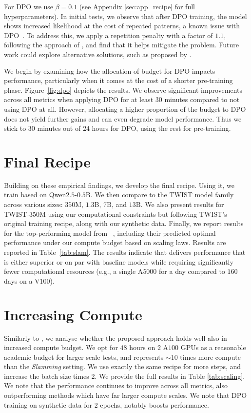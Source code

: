 For DPO we use $\beta=0.1$ (see Appendix \ref{sec:app_recipe} for full hyperparameters). In initial tests, we observe that after DPO training, the model shows increased likelihood at the cost of repeated patterns, a known issue with DPO~\citep{divpo}. To address this, we apply a repetition penalty with a factor of $1.1$, following the approach of \citet{ctrl}, and find that it helps mitigate the problem. Future work could explore alternative solutions, such as proposed by \citet{divpo}. 

We begin by examining how the allocation of budget for DPO impacts performance, particularly when it comes at the cost of a shorter pre-training phase. Figure~\ref{fig:dpo} depicts the results. We observe significant improvements across all metrics when applying DPO for at least $30$ minutes compared to not using DPO at all. However, allocating a higher proportion of the budget to DPO does not yield further gains and can even degrade model performance. Thus we stick to $30$ minutes out of $24$  hours for DPO, using the rest for pre-training. 


\section{Final Recipe} 
\label{sec:recipe}
Building on these empirical findings, we develop the final \method recipe. Using it, we train \slms based on Qwen$2.5$-$0.5$B. We then compare \method to the TWIST model family across various sizes: $350$M, $1.3$B, $7$B, and $13$B. We also present results for TWIST-$350$M using our computational constraints but following TWIST's original training recipe, along with our synthetic data. Finally, we report results for the top-performing model from ~\cite{cuervo2024scaling}, including their predicted optimal performance under our compute budget based on \slm scaling laws. Results are reported in Table~\ref{tab:slam}. The results indicate that \method delivers performance that is either superior or on par with baseline models while requiring significantly fewer computational resources (e.g., a single A$5000$ for a day compared to $160$ days on a V$100$).

\section{Increasing Compute} 
\label{sec:scale}

Similarly to \citet{geiping2023cramming}, we analyse whether the proposed approach holds well also in increased compute budget. We opt for $48$ hours on $2$ A$100$ GPUs as a reasonable academic budget for larger scale tests, and represents $\sim10$ times more compute than the \textit{Slamming} setting. We use exactly the same \method recipe for more steps, and increase the batch size times $2$. We provide the full results in Table \ref{tab:scaling}. We note that the performance continues to improve across all metrics, also outperforming methods which have far larger compute scales. We note that DPO training on synthetic data for $2$ epochs, notably boosts performance.


